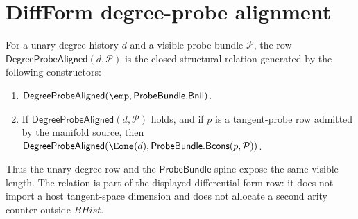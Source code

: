 \section{DiffForm degree-probe alignment}
\label{sec:diffform-degree-probe-alignment}

\begin{definition}
\label{def:diffform-degree-probe-alignment-row}
For a unary degree history $d$ and a visible probe bundle $\mathcal{P}$, the
row $\mathsf{DegreeProbeAligned}(d,\mathcal{P})$ is the closed structural
relation generated by the following constructors:
\begin{enumerate}
  \item $\mathsf{DegreeProbeAligned}(\emp,\mathsf{ProbeBundle.Bnil})$.
  \item If $\mathsf{DegreeProbeAligned}(d,\mathcal{P})$ holds, and if $p$ is a
  tangent-probe row admitted by the manifold source, then
  $\mathsf{DegreeProbeAligned}(\Eone(d),\mathsf{ProbeBundle.Bcons}(p,\mathcal{P}))$.
\end{enumerate}
Thus the unary degree row and the $\mathsf{ProbeBundle}$ spine expose the same
visible length. The relation is part of the displayed differential-form row:
it does not import a host tangent-space dimension and does not allocate a
second arity counter outside $BHist$.
\end{definition}

